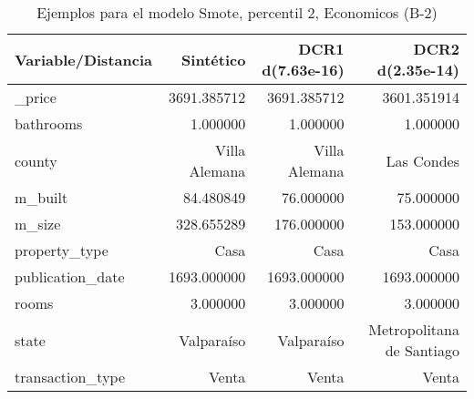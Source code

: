 \begin{table}[H]
\centering
\fontsize{10}{14}\selectfont
\caption{Ejemplos para el modelo Smote, percentil 2, Economicos (B-2)}
\label{table-example-economicos-b-2-smote-enc-2p}
\begin{tabular}{|l|r|r|r|}
\hline
\rowcolor[gray]{0.8}
Variable/Distancia & Sintético & DCR1 d(7.63e-16) & DCR2 d(2.35e-14) \\
\hline \_price & \cellcolor[rgb]{0.9, 0.54, 0.52} 3691.385712 & \cellcolor[rgb]{0.9, 0.54, 0.52} 3691.385712 & 3601.351914 \\
\hline bathrooms & \cellcolor[rgb]{0.9, 0.54, 0.52} 1.000000 & \cellcolor[rgb]{0.9, 0.54, 0.52} 1.000000 & \cellcolor[rgb]{0.9, 0.54, 0.52} 1.000000 \\
\hline county & \cellcolor[rgb]{0.9, 0.54, 0.52} Villa Alemana & \cellcolor[rgb]{0.9, 0.54, 0.52} Villa Alemana & Las Condes \\
\hline m\_built & \cellcolor[rgb]{0.9, 0.54, 0.52} 84.480849 & 76.000000 & 75.000000 \\
\hline m\_size & \cellcolor[rgb]{0.9, 0.54, 0.52} 328.655289 & 176.000000 & 153.000000 \\
\hline property\_type & \cellcolor[rgb]{0.9, 0.54, 0.52} Casa & \cellcolor[rgb]{0.9, 0.54, 0.52} Casa & \cellcolor[rgb]{0.9, 0.54, 0.52} Casa \\
\hline publication\_date & \cellcolor[rgb]{0.9, 0.54, 0.52} 1693.000000 & \cellcolor[rgb]{0.9, 0.54, 0.52} 1693.000000 & \cellcolor[rgb]{0.9, 0.54, 0.52} 1693.000000 \\
\hline rooms & \cellcolor[rgb]{0.9, 0.54, 0.52} 3.000000 & \cellcolor[rgb]{0.9, 0.54, 0.52} 3.000000 & \cellcolor[rgb]{0.9, 0.54, 0.52} 3.000000 \\
\hline state & \cellcolor[rgb]{0.9, 0.54, 0.52} Valparaíso & \cellcolor[rgb]{0.9, 0.54, 0.52} Valparaíso & Metropolitana de Santiago \\
\hline transaction\_type & \cellcolor[rgb]{0.9, 0.54, 0.52} Venta & \cellcolor[rgb]{0.9, 0.54, 0.52} Venta & \cellcolor[rgb]{0.9, 0.54, 0.52} Venta \\
\hline
\end{tabular}
\end{table}
